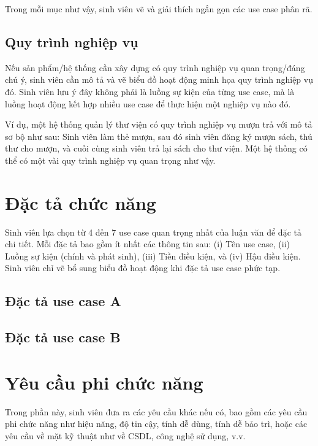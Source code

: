 \documentclass[../LuanVan.tex]{subfiles}
\begin{document}
Trong mỗi mục như vậy, sinh viên vẽ và giải thích ngắn gọn các use case phân rã.

\subsection{Quy trình nghiệp vụ}
\label{subsection:2.2.3}
Nếu sản phẩm/hệ thống cần xây dựng có quy trình nghiệp vụ quan trọng/đáng chú ý, sinh viên cần mô tả và vẽ biểu đồ hoạt động minh họa quy trình nghiệp vụ đó. Sinh viên lưu ý đây không phải là luồng sự kiện của từng use case, mà là luồng hoạt động kết hợp nhiều use case để thực hiện một nghiệp vụ nào đó.

Ví dụ, một hệ thống quản lý thư viện có quy trình nghiệp vụ mượn trả với mô tả sơ bộ như sau: Sinh viên làm thẻ mượn, sau đó sinh viên đăng ký mượn sách, thủ thư cho mượn, và cuối cùng sinh viên trả lại sách cho thư viện. Một hệ thống có thể có một vài quy trình nghiệp vụ quan trọng như vậy.
\section{Đặc tả chức năng}
\label{section:2.3}
Sinh viên lựa chọn từ 4 đến 7 use case quan trọng nhất của luận văn để đặc tả chi tiết. Mỗi đặc tả bao gồm ít nhất các thông tin sau: (i) Tên use case, (ii) Luồng sự kiện (chính và phát sinh), (iii) Tiền điều kiện, và (iv) Hậu điều kiện. Sinh viên chỉ vẽ bổ sung biểu đồ hoạt động khi đặc tả use case phức tạp.
\subsection{Đặc tả use case A}
\hfill
\subsection{Đặc tả use case B}
\hfill

\section{Yêu cầu phi chức năng}
\label{section:2.4}
Trong phần này, sinh viên đưa ra các yêu cầu khác nếu có, bao gồm các yêu cầu phi chức năng như hiệu năng, độ tin cậy, tính dễ dùng, tính dễ bảo trì, hoặc các yêu cầu về mặt kỹ thuật như về CSDL, công nghệ sử dụng, v.v.


\end{document}
